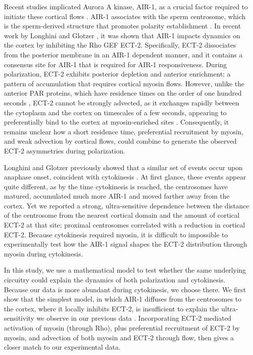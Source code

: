 \documentclass[11pt]{article}
\begin{document}
Recent studies implicated Aurora A kinase, AIR-1, as a crucial factor required to initiate these cortical flows \cite{klinkert2019aurora,kapoor2019centrosome, longhini2022aurora}. AIR-1 associates with the sperm centrosome, which is the sperm-derived structure that promotes polarity establishment \cite{hannak2001aurora}. In recent work by Longhini and Glotzer \cite{longhini2022aurora}, it was shown that AIR-1 impacts dynamics on the cortex by inhibiting the Rho GEF ECT-2. Specifically, ECT-2 dissociates from the posterior membrane in an AIR-1 dependent manner, and it contains a consensus site for AIR-1 that is required for AIR-1 responsiveness. During polarization, ECT-2 exhibits posterior depletion and anterior enrichment; a pattern of accumulation that requires cortical myosin flows. However, unlike the anterior PAR proteins, which have residence times on the order of one hundred seconds \cite{robin2014single}, ECT-2 cannot be strongly advected, as it exchanges rapidly between the cytoplasm and the cortex on timescales of a few seconds, appearing to preferentially bind to the cortex at myosin-enriched sites \cite{longhini2022aurora}. Consequently, it remains unclear how a short residence time, preferential recruitment by myosin, and weak advection by cortical flows, could combine to generate the observed ECT-2 asymmetries during polarization. 

Longhini and Glotzer previously showed that a similar set of events occur upon anaphase onset, coincident with cytokinesis \cite{longhini2022aurora}. At first glance, these events appear quite different, as by the time cytokinesis is reached, the centrosomes have matured,  accumulated much more \mbox{AIR-1} and moved farther away from the cortex. Yet we reported a strong, ultra-sensitive dependence between the distance of the centrosome from the nearest cortical domain and the amount of cortical ECT-2 at that site; proximal centrosomes correlated with a reduction in cortical ECT-2. Because cytokinesis required myosin, it is difficult to impossible to experimentally test how the AIR-1 signal shapes the ECT-2 distribution through myosin during cytokinesis. 

In this study, we use a mathematical model to test whether the same underlying circuitry could explain the dynamics of both polarization and cytokinesis. Because our data is more abundant during cytokinesis, we choose there. We first show that the simplest model, in which AIR-1 diffuses from the centrosomes to the cortex, where it locally inhibits ECT-2, is insufficient to explain the ultra-sensitivity we observe in our previous data \cite[Fig.~7A]{longhini2022aurora}. Incorporating ECT-2 mediated activation of myosin (through Rho), plus preferential recruitment of ECT-2 by myosin, and advection of both myosin and ECT-2 through flow, then gives a closer match to our experimental data. 
\end{document}
